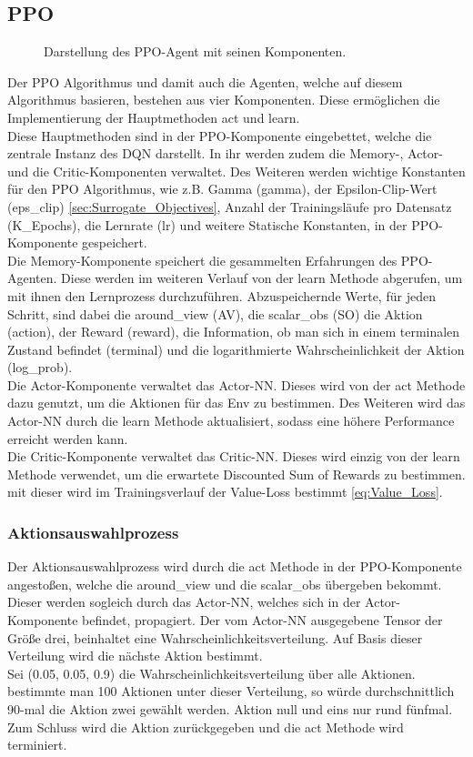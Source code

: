 \subsection{PPO}
\begin{figure}[H]
	\centering
	\def\svgscale{0.18}
	
	\caption[PPO-Agent]{Darstellung des PPO-Agent mit seinen Komponenten.}
	\label{fig:PPO-Agent}
\end{figure}
Der PPO Algorithmus und damit auch die Agenten, welche auf diesem Algorithmus basieren, bestehen aus vier Komponenten. Diese ermöglichen die Implementierung der Hauptmethoden act und learn.\\
Diese Hauptmethoden sind in der PPO-Komponente eingebettet, welche die zentrale Instanz des DQN darstellt. In ihr werden zudem die Memory-, Actor- und die Critic-Komponenten verwaltet. Des Weiteren werden wichtige Konstanten für den PPO Algorithmus, wie z.B. Gamma (gamma), der Epsilon-Clip-Wert (eps\_clip) \ref{sec:Surrogate_Objectives}, Anzahl der Trainingsläufe pro Datensatz (K\_Epochs), die Lernrate (lr) und weitere Statische Konstanten, in der PPO-Komponente gespeichert.\\
Die Memory-Komponente speichert die gesammelten Erfahrungen des PPO-Agenten. Diese werden im weiteren Verlauf von der learn Methode abgerufen, um mit ihnen den Lernprozess durchzuführen. Abzuspeichernde Werte, für jeden Schritt, sind dabei die around\_view (AV), die scalar\_obs (SO) die Aktion (action), der Reward (reward), die Information, ob man sich in einem terminalen Zustand befindet (terminal) und die logarithmierte Wahrscheinlichkeit der Aktion (log\_prob). \\
Die Actor-Komponente verwaltet das Actor-NN. Dieses wird von der act Methode dazu genutzt, um die Aktionen für das Env zu bestimmen. Des Weiteren wird das Actor-NN durch die learn Methode aktualisiert, sodass eine höhere Performance erreicht werden kann.\\
Die Critic-Komponente verwaltet das Critic-NN. Dieses wird einzig von der learn Methode verwendet, um die erwartete Discounted Sum of Rewards zu bestimmen. mit dieser wird im Trainingsverlauf der Value-Loss bestimmt \ref{eq:Value_Loss}.

\subsubsection{Aktionsauswahlprozess} \label{sec:Konzept_Aktionsauswahlprozess_PPO}
Der Aktionsauswahlprozess wird durch die act Methode in der PPO-Komponente angestoßen, welche die around\_view und die scalar\_obs übergeben bekommt. Dieser werden sogleich durch das Actor-NN, welches sich in der Actor-Komponente befindet, propagiert. Der vom Actor-NN ausgegebene Tensor der Größe drei, beinhaltet eine Wahrscheinlichkeitsverteilung. Auf Basis dieser Verteilung wird die nächste Aktion bestimmt.\\
Sei (0.05, 0.05, 0.9) die Wahrscheinlichkeitsverteilung über alle Aktionen. bestimmte man 100 Aktionen unter dieser Verteilung, so würde durchschnittlich 90-mal die Aktion zwei gewählt werden. Aktion null und eins nur rund fünfmal.\\
Zum Schluss wird die Aktion zurückgegeben und die act Methode wird terminiert.

